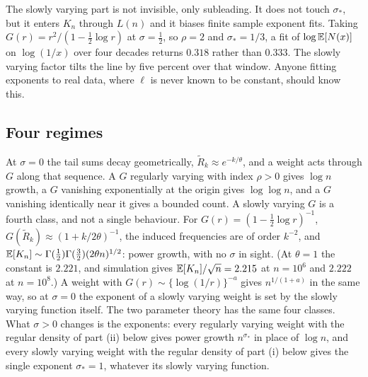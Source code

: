 The slowly varying part is not invisible, only subleading. It does not touch $\sigma_*$, but it
enters $K_n$ through $L(n)$ and it biases finite sample exponent fits. Taking
$G(r) = r^{2}/(1-\tfrac12\log r)$ at $\sigma = \tfrac12$, so $\rho = 2$ and $\sigma_* = 1/3$, a fit of
$\log\mathbb{E}[N(x)]$ on $\log(1/x)$ over four decades returns $0.318$ rather than $0.333$. The slowly
varying factor tilts the line by five percent over that window. Anyone fitting exponents to real data, where $\ell$ is never known to be constant, should know
this.

\subsection{Four regimes}
\label{py:sec:regimes}

At $\sigma = 0$ the tail sums decay geometrically, $\widetilde R_k \approx e^{-k/\theta}$, and a weight acts through $G$ along that sequence. A $G$ regularly varying with index $\rho > 0$ gives $\log n$ growth, a $G$ vanishing exponentially at the origin gives $\log\log n$, and a $G$ vanishing identically near it gives a bounded count. A slowly varying $G$ is a fourth class, and not a single behaviour. For $G(r) = (1-\tfrac12\log r)^{-1}$, $G(\widetilde R_k) \approx (1+k/2\theta)^{-1}$, the induced frequencies are of order $k^{-2}$, and $\mathbb{E}[K_n] \sim \Gamma(\tfrac12)\Gamma(\tfrac32)(2\theta n)^{1/2}$: power growth, with no $\sigma$ in sight. (At $\theta = 1$ the constant is $2.221$, and simulation gives $\mathbb{E}[K_n]/\sqrt{n} = 2.215$ at $n = 10^{6}$ and $2.222$ at $n = 10^{8}$.) A weight with $G(r) \sim \{\log(1/r)\}^{-a}$ gives $n^{1/(1+a)}$ in the same way, so at $\sigma = 0$ the exponent of a slowly varying weight is set by the slowly varying function itself. The two parameter theory has the same four classes. What $\sigma > 0$ changes is the exponents: every regularly varying weight with the regular density of part (ii) below gives power growth $n^{\sigma_*}$ in place of $\log n$, and every slowly varying weight with the regular density of part (i) below gives the single exponent $\sigma_* = 1$, whatever its slowly varying function.

